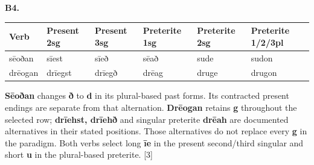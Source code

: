 \par\begin{minipage}{\linewidth}\raggedright
\textbf{B4.}

\par\begingroup
\fontsize{10.5}{13.2}\selectfont
\setlength{\LTleft}{0pt}\setlength{\LTright}{\fill}
\noindent
\begin{tabular}{@{}>{\raggedright\arraybackslash}p{17.12mm}>{\raggedright\arraybackslash}p{17.12mm}>{\raggedright\arraybackslash}p{17.12mm}>{\raggedright\arraybackslash}p{18.49mm}>{\raggedright\arraybackslash}p{18.49mm}>{\raggedright\arraybackslash}p{21.58mm}@{}}
\toprule
\textbf{Verb} & \textbf{Present 2sg} & \textbf{Present 3sg} & \textbf{Preterite 1sg} & \textbf{Preterite 2sg} & \textbf{Preterite 1/\allowbreak{}2/\allowbreak{}3pl} \\
\midrule
sēoðan & sīest & sīeð & sēað & sude & sudon \\
drēogan & drīegst & drīegð & drēag & druge & drugon \\
\bottomrule
\end{tabular}
\par\endgroup

\textbf{Sēoðan} changes \textbf{ð} to \textbf{d} in its plural-based past forms. Its contracted present endings are separate from that alternation. \textbf{Drēogan} retains \textbf{g} throughout the selected row; \textbf{drīehst, drīehð} and singular preterite \textbf{drēah} are documented alternatives in their stated positions. Those alternatives do not replace every \textbf{g} in the paradigm. Both verbs select long \textbf{īe} in the present second/\allowbreak{}third singular and short \textbf{u} in the plural-based preterite. [3]

\end{minipage}\par\addvspace{4pt}

